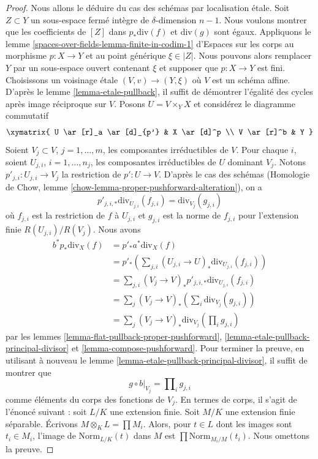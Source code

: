 \begin{proof}
Nous allons le déduire du cas des schémas par localisation \'etale. Soit $Z
\subset Y$ un sous-espace fermé intègre de $\delta$-dimension $n - 1$.
Nous voulons montrer que les coefficients de $[Z]$ dans $p_*\text{div}(f)$ et
$\text{div}(g)$ sont égaux. Appliquons le lemme
\ref{spaces-over-fields-lemma-finite-in-codim-1} d'Espaces sur les corps au
morphisme $p : X \to Y$ et au point générique $\xi \in |Z|$. Nous pouvons
alors remplacer $Y$ par un sous-espace ouvert contenant $\xi$ et supposer que
$p : X \to Y$ est fini. Choisissons un voisinage \'etale $(V, v) \to (Y, \xi)$
où $V$ est un schéma affine. D'après le lemme \ref{lemma-etale-pullback}, il
suffit de démontrer l'égalité des cycles après image réciproque sur $V$. Posons
$U = V \times_Y X$ et
considérez le diagramme commutatif
$$
\xymatrix{
U \ar[r]_a \ar[d]_{p'} & X \ar[d]^p \\
V \ar[r]^b & Y
}
$$
Soient $V_j \subset V$, $j = 1, \ldots, m$, les composantes irréductibles de
$V$. Pour chaque $i$, soient $U_{j, i}$, $i = 1, \ldots, n_j$, les composantes
irréductibles de $U$ dominant $V_j$. Notons $p'_{j, i} : U_{j, i} \to V_j$ la
restriction de $p' : U \to V$. D'après le cas des schémas (Homologie de Chow,
lemme \ref{chow-lemma-proper-pushforward-alteration}), on a
$$
p'_{j, i, *}\text{div}_{U_{j, i}}(f_{j, i}) = \text{div}_{V_j}(g_{j, i})
$$
où $f_{j, i}$ est la restriction de $f$ à $U_{j, i}$ et $g_{j, i}$ est la
norme de $f_{j, i}$ pour l'extension finie $R(U_{j, i})/R(V_j)$. Nous
avons
\begin{align*}
b^* p_*\text{div}_X(f)
& =
p'_* a^* \text{div}_X(f) \\
& =
p'_*\left(\sum\nolimits_{j, i}
(U_{j, i} \to U)_*\text{div}_{U_{j, i}}(f_{j, i})\right) \\
& =
\sum\nolimits_{j, i}
(V_j \to V)_*p'_{j, i, *}\text{div}_{U_{j, i}}(f_{j, i}) \\
& =
\sum\nolimits_j
(V_j \to V)_*\left(\sum\nolimits_i \text{div}_{V_j}(g_{j, i})\right) \\
& =
\sum\nolimits_j (V_j \to V)_*\text{div}_{V_j}(\prod\nolimits_i g_{j, i})
\end{align*}
par les lemmes \ref{lemma-flat-pullback-proper-pushforward},
\ref{lemma-etale-pullback-principal-divisor} et
\ref{lemma-compose-pushforward}. Pour terminer la preuve, en utilisant à
nouveau le lemme \ref{lemma-etale-pullback-principal-divisor}, il suffit de
montrer que
$$
g \circ b|_{V_j} = \prod\nolimits_i g_{j, i}
$$
comme éléments du corps des fonctions de $V_j$. En termes de corps, il s'agit
de l'énoncé suivant : soit $L/K$ une extension finie. Soit $M/K$ une extension
finie séparable. Écrivons $M \otimes_K L = \prod M_i$. Alors, pour $t \in L$
dont les images sont $t_i \in M_i$, l'image de $\text{Norm}_{L/K}(t)$ dans $M$ est
$\prod \text{Norm}_{M_i/M}(t_i)$. Nous omettons la preuve.
\end{proof}







